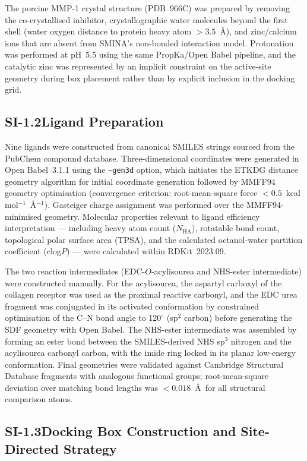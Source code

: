 \documentclass[11pt]{article}
\begin{document}
The porcine MMP-1 crystal structure (PDB~966C) was prepared by removing the
co-crystallised inhibitor, crystallographic water molecules beyond the first
shell (water oxygen distance to protein heavy atom $> 3.5$~\AA), and
zinc/calcium ions that are absent from SMINA's non-bonded interaction
model.
Protonation was performed at pH~5.5 using the same PropKa/Open Babel
pipeline, and the catalytic zinc was represented by an implicit constraint
on the active-site geometry during box placement rather than by explicit
inclusion in the docking grid.

\subsection*{SI-1.2\quad Ligand Preparation}

Nine ligands were constructed from canonical SMILES strings sourced from
the PubChem compound database.
Three-dimensional coordinates were generated in Open Babel~3.1.1 using the
\texttt{--gen3d} option, which initiates the ETKDG distance geometry
algorithm for initial coordinate generation followed by MMFF94 geometry
optimisation (convergence criterion: root-mean-square force $< 0.5$~kcal
mol$^{-1}$~\AA$^{-1}$).
Gasteiger charge assignment was performed over the MMFF94-minimised
geometry.
Molecular properties relevant to ligand efficiency interpretation ---
including heavy atom count ($N_\mathrm{HA}$), rotatable bond count, topological
polar surface area (TPSA), and the calculated octanol-water partition
coefficient (clog$P$) --- were calculated within RDKit~2023.09.

The two reaction intermediates (EDC-$O$-acylisourea and NHS-ester intermediate)
were constructed manually.
For the acylisourea, the aspartyl carboxyl of the collagen receptor was used
as the proximal reactive carbonyl, and the EDC urea fragment was conjugated
in its activated conformation by constrained optimisation of the C--N bond
angle to 120$^{\circ}$ (sp$^2$ carbon) before generating the SDF geometry
with Open Babel.
The NHS-ester intermediate was assembled by forming an ester bond between the
SMILES-derived NHS sp$^3$ nitrogen and the acylisourea carbonyl carbon, with
the imide ring locked in its planar low-energy conformation.
Final geometries were validated against Cambridge Structural Database fragments
with analogous functional groups; root-mean-square deviation over matching
bond lengths was $< 0.018$~\AA\ for all structural comparison atoms.

\subsection*{SI-1.3\quad Docking Box Construction and Site-Directed Strategy}
\end{document}
